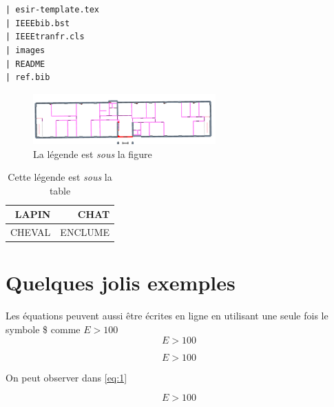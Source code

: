 \documentclass[twocolumn,a4paper]{IEEEtranfr}
\begin{document}
{\begin{verbatim}


| esir-template.tex
| IEEEbib.bst
| IEEEtranfr.cls
| images
| README
| ref.bib

\end{verbatim}

\begin{figure}[htbp]
\begin{centering}
\par
\includegraphics[width=7cm]{Gs2.png}
\caption{La légende est \emph{sous} la figure}
\end{centering}
\end{figure}
%



\begin{table}[htbp]
\centering{}
\begin{tabular}{|r|r|}
\hline 
LAPIN & CHAT \\
\hline
CHEVAL  & ENCLUME \\
\hline
\end{tabular}
\caption{Cette légende  est \emph{sous} la table}
\end{table}
 
\section{Quelques jolis exemples}

Les équations peuvent aussi être écrites en ligne en utilisant une seule fois le symbole \$ comme $E>100$ $$E>100$$

\begin{equation}
E >100
\label{eq:1}
\end{equation}

On peut observer dans \ref{eq:1}}
\begin{equation*}
E >100
\end{equation*}
\end{document}
